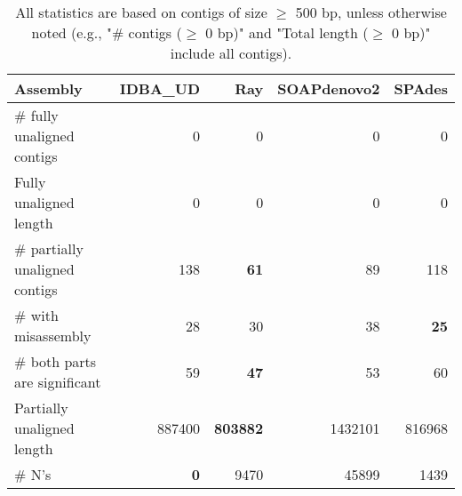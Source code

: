 \documentclass[12pt,a4paper]{article}
\begin{document}
\begin{table}[ht]
\begin{center}
\caption{All statistics are based on contigs of size $\geq$ 500 bp, unless otherwise noted (e.g., "\# contigs ($\geq$ 0 bp)" and "Total length ($\geq$ 0 bp)" include all contigs).}
\begin{tabular}{|l*{4}{|r}|}
\hline
Assembly & IDBA\_UD & Ray & SOAPdenovo2 & SPAdes \\ \hline
\# fully unaligned contigs & 0 & 0 & 0 & 0 \\ \hline
Fully unaligned length & 0 & 0 & 0 & 0 \\ \hline
\# partially unaligned contigs & 138 & {\bf 61} & 89 & 118 \\ \hline
\hspace{5mm}\# with misassembly & 28 & 30 & 38 & {\bf 25} \\ \hline
\hspace{5mm}\# both parts are significant & 59 & {\bf 47} & 53 & 60 \\ \hline
Partially unaligned length & 887400 & {\bf 803882} & 1432101 & 816968 \\ \hline
\# N's & {\bf 0} & 9470 & 45899 & 1439 \\ \hline
\end{tabular}
\end{center}
\end{table}
\end{document}
